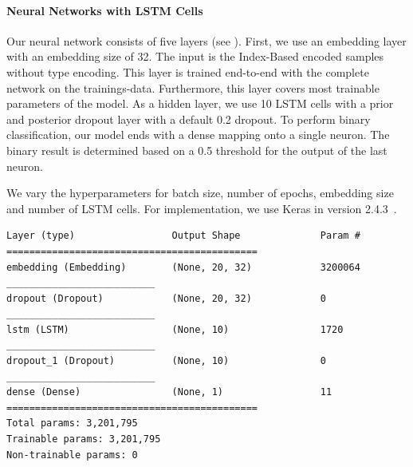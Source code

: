 \paragraph{Neural Networks with LSTM Cells}
Our neural network consists of five layers (see ). First, we use an embedding layer with an embedding size of 32. The input is the Index-Based encoded samples without type encoding. This layer is trained end-to-end with the complete network on the trainings-data. Furthermore, this layer covers most trainable parameters of the model. As a hidden layer, we use 10 LSTM cells with a prior and posterior dropout layer with a default 0.2 dropout. To perform binary classification, our model ends with a dense mapping onto a single neuron. The binary result is determined based on a 0.5 threshold for the output of the last neuron.

We vary the hyperparameters for batch size, number of epochs, embedding size and number of LSTM cells. For implementation, we use Keras in version 2.4.3~\cite{chollet2015keras}.

\begin{lstlisting}[float=t, label=lst:lstm, caption={Summary of our LSTM network. We use an embedding layer of size 32, 10 LSTM cells, a dropout layer before and after the LSTM layer with a default dropout ratio of 0.2 and a dense mapping to a single output neuron for binary classification with a threshold of 0.5.}]
Layer (type)                 Output Shape              Param #
============================================
embedding (Embedding)        (None, 20, 32)            3200064
__________________________
dropout (Dropout)            (None, 20, 32)            0
__________________________
lstm (LSTM)                  (None, 10)                1720
__________________________
dropout_1 (Dropout)          (None, 10)                0
__________________________
dense (Dense)                (None, 1)                 11
============================================
Total params: 3,201,795
Trainable params: 3,201,795
Non-trainable params: 0\end{lstlisting}